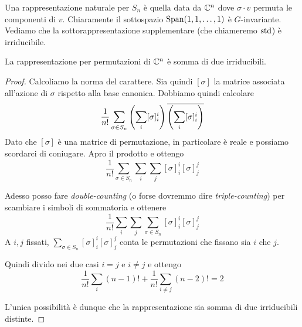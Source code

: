     Una rappresentazione naturale per $S_n$ è quella data da $\mathbb C^n$ dove $\sigma \cdot v$ permuta le componenti di $v$. Chiaramente il sottospazio $\operatorname{Span}(1,1,\dots,1)$ è $G$-invariante. Vediamo che la sottorappresentazione supplementare (che chiameremo $\operatorname{std}$) è irriducibile.
    
    \begin{myprop}
     La rappresentazione per permutazioni di $\mathbb C^n$ è somma di due irriducibili.
    \end{myprop}
    \begin{proof}
     Calcoliamo la norma del carattere. Sia quindi $[\sigma]$ la matrice associata all'azione di $\sigma$ rispetto alla base canonica.
     Dobbiamo quindi calcolare
     \[
      \frac1{n!}\sum_{\sigma\in S_n} \left(\sum_i [\sigma]_i^i\right)\overline{\left(\sum_i[\sigma]_i^i\right)}
     \]
     Dato che $[\sigma]$ è una matrice di permutazione, in particolare è reale e possiamo scordarci di coniugare. Apro il prodotto e ottengo
     \[
      \frac1{n!}\sum_{\sigma\in S_n} \sum_i \sum_j [\sigma]_i^i[\sigma]_j^j
     \]
     
     Adesso posso fare \emph{double-counting} (o forse dovremmo dire \emph{triple-counting}) per scambiare i simboli di sommatoria e ottenere
     \[
      \frac1{n!}\sum_i \sum_j\sum_{\sigma\in S_n} [\sigma]_i^i[\sigma]_j^j      
     \]
     A $i,j$ fissati, $\sum_{\sigma\in S_n} [\sigma]_i^i[\sigma]_j^j$ conta le permutazioni che fissano sia $i$ che $j$.
     
     Quindi divido nei due casi $i=j$ e $i\ne j$ e ottengo
     \[
      \frac1{n!}\sum_i (n-1)! +  \frac1{n!}\sum_{i\ne j} (n-2)! = 2
     \]
     
     L'unica possibilità è dunque che la rappresentazione sia somma di due irriducibili distinte.
    \end{proof}
  





